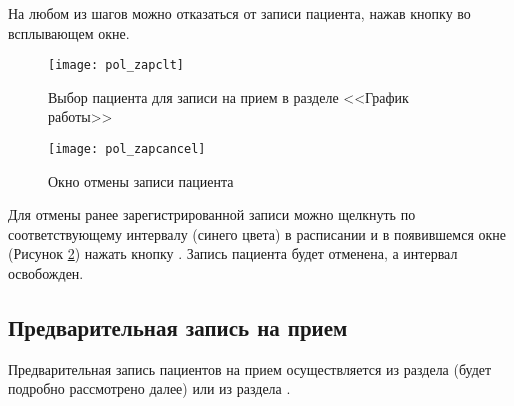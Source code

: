 На любом из шагов можно отказаться от записи пациента, нажав кнопку  во всплывающем окне. 

\begin{figure}[ht]\centering
 \texttt{[image: pol\_zapclt]}
 \caption{Выбор пациента для записи на прием в разделе <<График работы>>}
 \label{img_pol_zapclt}
\end{figure}

\begin{figure}[ht]\centering
 \texttt{[image: pol\_zapcancel]}
 \caption{Окно отмены записи пациента}
 \label{img_pol_zapcancel}
\end{figure}

Для отмены ранее зарегистрированной записи можно щелкнуть по соответствующему интервалу (синего цвета) в расписании и в появившемся окне (Рисунок \ref{img_pol_zapcancel}) нажать кнопку . Запись пациента будет отменена, а интервал освобожден.

\subsection{Предварительная запись на прием}\label{pol_predvz}

{Предварительная запись пациентов на прием осуществляется из раздела  (будет подробно рассмотрено далее) или из раздела .} 

